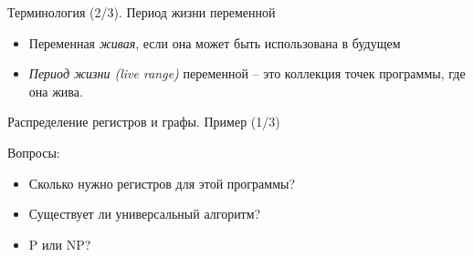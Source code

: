 \documentclass[aspectratio=169
  , xcolor={svgnames}
  , hyperref={ colorlinks,citecolor=DeepPink4
             , linkcolor=DarkRed,urlcolor=DarkBlue}
  , russian
  ]{beamer}
\theoremstyle{exerciseStyle1}
\begin{document}
\begin{frame}{Терминология (2/3). Период жизни переменной}
\begin{minipage}{.48\textwidth}
\begin{itemize}
\item Переменная \emph{живая}, если она может быть использована в будущем
\item \emph{Период жизни (live range)} переменной -- это коллекция точек программы, где она жива.
\end{itemize}
\end{minipage}
\end{frame}

\begin{frame}[fragile]{Распределение регистров  и графы. Пример (1/3)}
\begin{minipage}{.48\textwidth}
Вопросы:
\begin{itemize}
\item Сколько нужно регистров для этой программы?
\item Существует ли универсальный алгоритм?
\item P или NP?
\end{itemize}

\end{minipage}
\end{frame}
\end{document}
